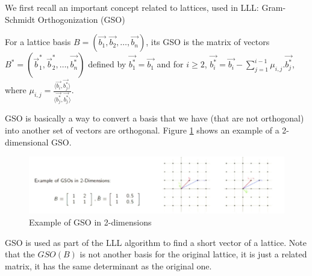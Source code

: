 We first recall an important concept related to lattices, used in LLL:
Gram-Schmidt Orthogonization (GSO)
\begin{definition}
  [GSO] For a lattice basis
  $B = \left( \vec{b_1}, \vec{b_2}, \dots, \vec{b_n} \right)$, its GSO is the
  matrix of vectors
  $B^* = \left( \vec{b}_1^*, \vec{b}_2^*, \dots, \vec{b_n^*} \right)$ defined by
  $\vec{b_1^*} = \vec{b_1}$ and for $i \geq 2$,
  $\vec{b_i^*} = \vec{b_i} - \sum_{j=1}^{i-1}{\mu_{i,j}.\vec{b_j^*}}$, where
  $\mu_{i,j} = \frac{\langle \vec{b_i}, \vec{b_j^*} \rangle}{\langle
    \vec{b_j^*},\vec{b_j^*} \rangle}$.
  \label{def:GSO}
\end{definition}
GSO is basically a way to convert a basis that we have (that are not orthogonal)
into another set of vectors are orthogonal. Figure \ref{fig:gso} shows an
example of a 2-dimensional GSO. 
\begin{figure}[h]
  \centering \includegraphics[scale=0.3]{gso}
  \caption{Example of GSO in 2-dimensions}
  \label{fig:gso}
\end{figure}
GSO is used as part of the LLL algorithm to find a short vector of a lattice.
Note that the $GSO(B)$ is not another basis for the original lattice, it is just
a related matrix, it has the same determinant as the original one.



